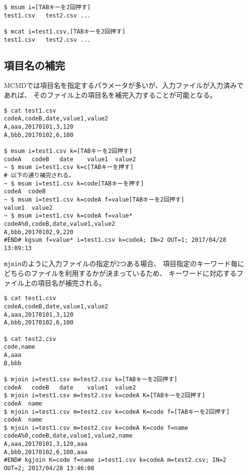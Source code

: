 \begin{Verbatim}[baselinestretch=0.7,frame=single]
$ msum i=[TABキーを2回押す]
test1.csv   test2.csv ...

$ mcat i=test1.csv,[TABキーを2回押す]
test1.csv   test2.csv ...
\end{Verbatim}

\subsection{項目名の補完\label{sect:bash_comp_field}}
MCMDでは項目名を指定するパラメータが多いが、入力ファイルが入力済みであれば、
そのファイル上の項目名を補完入力することが可能となる。

\begin{Verbatim}[baselinestretch=0.7,frame=single]
$ cat test1.csv 
codeA,codeB,date,value1,value2
A,aaa,20170101,3,120
A,bbb,20170102,6,100

$ msum i=test1.csv k=[TABキーを2回押す]
codeA   codeB   date    value1  value2  
~ $ msum i=test1.csv k=c[TABキーを押す]
# 以下の通り補完される。
~ $ msum i=test1.csv k=code[TABキーを押す]
codeA  codeB
~ $ msum i=test1.csv k=codeA f=value[TABキーを2回押す]
value1  value2
~ $ msum i=test1.csv k=codeA f=value*
codeA%0,codeB,date,value1,value2
A,bbb,20170102,9,220
#END# kgsum f=value* i=test1.csv k=codeA; IN=2 OUT=1; 2017/04/28 13:09:13
\end{Verbatim}

\verb|mjoin|のように入力ファイルの指定が2つある場合、
項目指定のキーワード毎にどちらのファイルを利用するかが決まっているため、
キーワードに対応するファイル上の項目名が補完される。

\begin{Verbatim}[baselinestretch=0.7,frame=single]
$ cat test1.csv 
codeA,codeB,date,value1,value2
A,aaa,20170101,3,120
A,bbb,20170102,6,100

$ cat test2.csv
code,name
A,aaa
B,bbb

$ mjoin i=test1.csv m=test2.csv k=[TABキーを2回押す]
codeA   codeB   date    value1  value2
$ mjoin i=test1.csv m=test2.csv k=codeA K=[TABキーを2回押す]
codeA  name
$ mjoin i=test1.csv m=test2.csv k=codeA K=code f=[TABキーを2回押す]
codeA  name
$ mjoin i=test1.csv m=test2.csv k=codeA K=code f=name
codeA%0,codeB,date,value1,value2,name
A,aaa,20170101,3,120,aaa
A,bbb,20170102,6,100,aaa
#END# kgjoin K=code f=name i=test1.csv k=codeA m=test2.csv; IN=2 OUT=2; 2017/04/28 13:46:08
\end{Verbatim}

